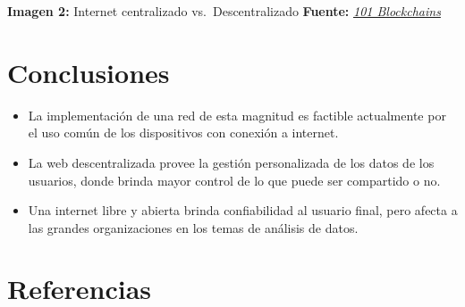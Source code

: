 \documentclass[12pt,spanish,Letterpaper,openany]{book}
\begin{document}


\textbf{Imagen 2:} Internet centralizado vs.~Descentralizado \textbf{Fuente:} \href{https://101blockchains.com/}{\emph{101 Blockchains}}


\hypertarget{conclusiones-10}{%
\section*{Conclusiones}\label{conclusiones-10}}

\begin{itemize}
\item
  La implementación de una red de esta magnitud es factible actualmente por el uso común de los dispositivos con conexión a internet.
\item
  La web descentralizada provee la gestión personalizada de los datos de los usuarios, donde brinda mayor control de lo que puede ser compartido o no.
\item
  Una internet libre y abierta brinda confiabilidad al usuario final, pero afecta a las grandes organizaciones en los temas de análisis de datos.
\end{itemize}

\hypertarget{referencias-10}{%
\section*{Referencias}\label{referencias-10}}
\end{document}
